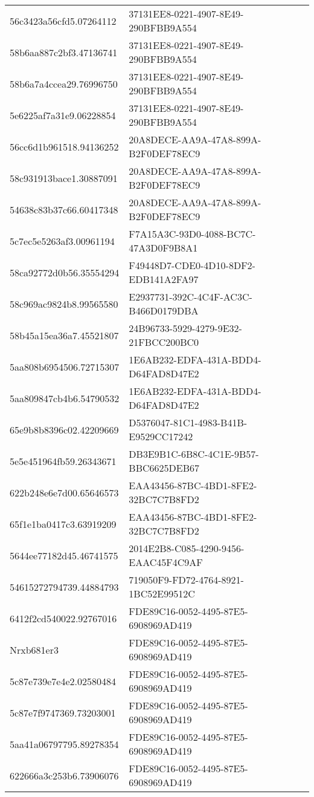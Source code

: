\begin{tabular}{ll}
56c3423a56cfd5.07264112 & 37131EE8-0221-4907-8E49-290BFBB9A554 \\
58b6aa887c2bf3.47136741 & 37131EE8-0221-4907-8E49-290BFBB9A554 \\
58b6a7a4ccea29.76996750 & 37131EE8-0221-4907-8E49-290BFBB9A554 \\
5e6225af7a31e9.06228854 & 37131EE8-0221-4907-8E49-290BFBB9A554 \\
56cc6d1b961518.94136252 & 20A8DECE-AA9A-47A8-899A-B2F0DEF78EC9 \\
58c931913bace1.30887091 & 20A8DECE-AA9A-47A8-899A-B2F0DEF78EC9 \\
54638c83b37c66.60417348 & 20A8DECE-AA9A-47A8-899A-B2F0DEF78EC9 \\
5c7ec5e5263af3.00961194 & F7A15A3C-93D0-4088-BC7C-47A3D0F9B8A1 \\
58ca92772d0b56.35554294 & F49448D7-CDE0-4D10-8DF2-EDB141A2FA97 \\
58c969ac9824b8.99565580 & E2937731-392C-4C4F-AC3C-B466D0179DBA \\
58b45a15ea36a7.45521807 & 24B96733-5929-4279-9E32-21FBCC200BC0 \\
5aa808b6954506.72715307 & 1E6AB232-EDFA-431A-BDD4-D64FAD8D47E2 \\
5aa809847cb4b6.54790532 & 1E6AB232-EDFA-431A-BDD4-D64FAD8D47E2 \\
65e9b8b8396c02.42209669 & D5376047-81C1-4983-B41B-E9529CC17242 \\
5e5e451964fb59.26343671 & DB3E9B1C-6B8C-4C1E-9B57-BBC6625DEB67 \\
622b248e6e7d00.65646573 & EAA43456-87BC-4BD1-8FE2-32BC7C7B8FD2 \\
65f1e1ba0417c3.63919209 & EAA43456-87BC-4BD1-8FE2-32BC7C7B8FD2 \\
5644ee77182d45.46741575 & 2014E2B8-C085-4290-9456-EAAC45F4C9AF \\
54615272794739.44884793 & 719050F9-FD72-4764-8921-1BC52E99512C \\
6412f2cd540022.92767016 & FDE89C16-0052-4495-87E5-6908969AD419 \\
Nrxb681er3 & FDE89C16-0052-4495-87E5-6908969AD419 \\
5c87e739e7e4e2.02580484 & FDE89C16-0052-4495-87E5-6908969AD419 \\
5c87e7f9747369.73203001 & FDE89C16-0052-4495-87E5-6908969AD419 \\
5aa41a06797795.89278354 & FDE89C16-0052-4495-87E5-6908969AD419 \\
622666a3c253b6.73906076 & FDE89C16-0052-4495-87E5-6908969AD419 \\

\end{tabular}
